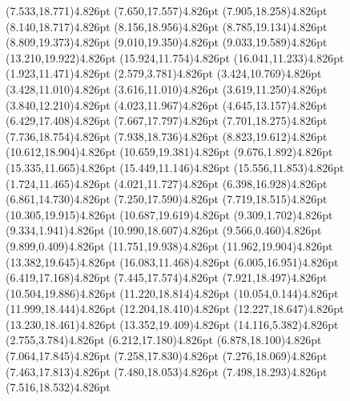 \documentclass[10pt]{article}
\begin{document}
{{\qdisk(7.533,18.771){4.826pt}%
\qdisk(7.650,17.557){4.826pt}%
\qdisk(7.905,18.258){4.826pt}%
\qdisk(8.140,18.717){4.826pt}%
\qdisk(8.156,18.956){4.826pt}%
\qdisk(8.785,19.134){4.826pt}%
\qdisk(8.809,19.373){4.826pt}%
\qdisk(9.010,19.350){4.826pt}%
\qdisk(9.033,19.589){4.826pt}%
\qdisk(13.210,19.922){4.826pt}%
\qdisk(15.924,11.754){4.826pt}%
\qdisk(16.041,11.233){4.826pt}%
\dummycolor
\qdisk(1.923,11.471){4.826pt}%
\qdisk(2.579,3.781){4.826pt}%
\qdisk(3.424,10.769){4.826pt}%
\qdisk(3.428,11.010){4.826pt}%
\qdisk(3.616,11.010){4.826pt}%
\qdisk(3.619,11.250){4.826pt}%
\qdisk(3.840,12.210){4.826pt}%
\qdisk(4.023,11.967){4.826pt}%
\qdisk(4.645,13.157){4.826pt}%
\qdisk(6.429,17.408){4.826pt}%
\qdisk(7.667,17.797){4.826pt}%
\qdisk(7.701,18.275){4.826pt}%
\qdisk(7.736,18.754){4.826pt}%
\qdisk(7.938,18.736){4.826pt}%
\qdisk(8.823,19.612){4.826pt}%
\qdisk(10.612,18.904){4.826pt}%
\qdisk(10.659,19.381){4.826pt}%
\qdisk(9.676,1.892){4.826pt}%
\qdisk(15.335,11.665){4.826pt}%
\qdisk(15.449,11.146){4.826pt}%
\qdisk(15.556,11.853){4.826pt}%
\dummycolor
\qdisk(1.724,11.465){4.826pt}%
\qdisk(4.021,11.727){4.826pt}%
\qdisk(6.398,16.928){4.826pt}%
\qdisk(6.861,14.730){4.826pt}%
\qdisk(7.250,17.590){4.826pt}%
\qdisk(7.719,18.515){4.826pt}%
\qdisk(10.305,19.915){4.826pt}%
\qdisk(10.687,19.619){4.826pt}%
\qdisk(9.309,1.702){4.826pt}%
\qdisk(9.334,1.941){4.826pt}%
\qdisk(10.990,18.607){4.826pt}%
\qdisk(9.566,0.460){4.826pt}%
\qdisk(9.899,0.409){4.826pt}%
\qdisk(11.751,19.938){4.826pt}%
\qdisk(11.962,19.904){4.826pt}%
\qdisk(13.382,19.645){4.826pt}%
\qdisk(16.083,11.468){4.826pt}%
\dummycolor
\qdisk(6.005,16.951){4.826pt}%
\qdisk(6.419,17.168){4.826pt}%
\qdisk(7.445,17.574){4.826pt}%
\qdisk(7.921,18.497){4.826pt}%
\qdisk(10.504,19.886){4.826pt}%
\qdisk(11.220,18.814){4.826pt}%
\qdisk(10.054,0.144){4.826pt}%
\qdisk(11.999,18.444){4.826pt}%
\qdisk(12.204,18.410){4.826pt}%
\qdisk(12.227,18.647){4.826pt}%
\qdisk(13.230,18.461){4.826pt}%
\qdisk(13.352,19.409){4.826pt}%
\qdisk(14.116,5.382){4.826pt}%
\dummycolor
\qdisk(2.755,3.784){4.826pt}%
\qdisk(6.212,17.180){4.826pt}%
\qdisk(6.878,18.100){4.826pt}%
\qdisk(7.064,17.845){4.826pt}%
\qdisk(7.258,17.830){4.826pt}%
\qdisk(7.276,18.069){4.826pt}%
\qdisk(7.463,17.813){4.826pt}%
\qdisk(7.480,18.053){4.826pt}%
\qdisk(7.498,18.293){4.826pt}%
\qdisk(7.516,18.532){4.826pt}%
}}
\end{document}
